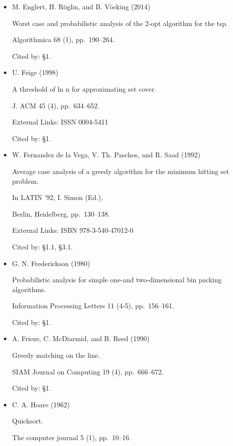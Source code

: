 \begin{itemize}
Cited by: Definition 3,
Lemma 31,
Lemma 32.



\item[] [10]
M. Englert, H. Röglin, and B. Vöcking (2014)

Worst case and probabilistic analysis of the 2-opt algorithm for the tsp.

Algorithmica 68 (1), pp. 190–264.

Cited by: §1.



\item[] [11]
U. Feige (1998)

A threshold of ln n for approximating set cover.

J. ACM 45 (4), pp. 634–652.

External Links: ISSN 0004-5411

Cited by: §1.



\item[] [12]
W. Fernandez de la Vega, V. Th. Paschos, and R. Saad (1992)

Average case analysis of a greedy algorithm for the minimum hitting set problem.

In LATIN ’92,  I. Simon (Ed.),

Berlin, Heidelberg, pp. 130–138.

External Links: ISBN 978-3-540-47012-0

Cited by: §1.1,
§3.1.



\item[] [13]
G. N. Frederickson (1980)

Probabilistic analysis for simple one-and two-dimensional bin packing algorithms.

Information Processing Letters 11 (4-5), pp. 156–161.

Cited by: §1.



\item[] [14]
A. Frieze, C. McDiarmid, and B. Reed (1990)

Greedy matching on the line.

SIAM Journal on Computing 19 (4), pp. 666–672.

Cited by: §1.



\item[] [15]
C. A. Hoare (1962)

Quicksort.

The computer journal 5 (1), pp. 10–16.


\end{itemize}
